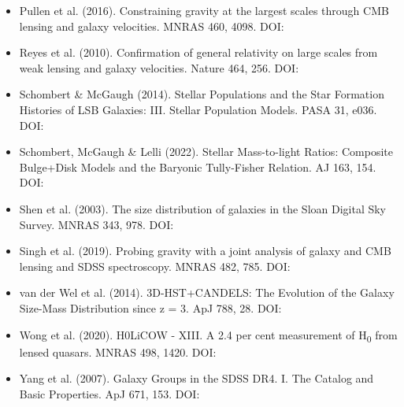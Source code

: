 \documentclass[11pt,a4paper]{article}
\begin{document}
\begin{itemize}
  \item Pullen et al. (2016). Constraining gravity at the largest scales through CMB lensing and galaxy velocities. MNRAS 460, 4098. DOI: \href{https://doi.org/10.1093/mnras/stw1249}{{\small\protect{}}}
  \item Reyes et al. (2010). Confirmation of general relativity on large scales from weak lensing and galaxy velocities. Nature 464, 256. DOI: \href{https://doi.org/10.1038/nature08857}{{\small\protect{}}}
  \item Schombert \& McGaugh (2014). Stellar Populations and the Star Formation Histories of LSB Galaxies: III. Stellar Population Models. PASA 31, e036. DOI: \href{https://doi.org/10.1017/pasa.2014.32}{{\small\protect{}}}
  \item Schombert, McGaugh \& Lelli (2022). Stellar Mass-to-light Ratios: Composite Bulge+Disk Models and the Baryonic Tully-Fisher Relation. AJ 163, 154. DOI: \href{https://doi.org/10.3847/1538-3881/ac5249}{{\small\protect{}}}
  \item Shen et al. (2003). The size distribution of galaxies in the Sloan Digital Sky Survey. MNRAS 343, 978. DOI: \href{https://doi.org/10.1046/j.1365-8711.2003.06740.x}{{\small\protect{}}}
  \item Singh et al. (2019). Probing gravity with a joint analysis of galaxy and CMB lensing and SDSS spectroscopy. MNRAS 482, 785. DOI: \href{https://doi.org/10.1093/mnras/sty2681}{{\small\protect{}}}
  \item van der Wel et al. (2014). 3D-HST+CANDELS: The Evolution of the Galaxy Size-Mass Distribution since z = 3. ApJ 788, 28. DOI: \href{https://doi.org/10.1088/0004-637X/788/1/28}{{\small\protect{}}}
  \item Wong et al. (2020). H0LiCOW  -  XIII. A 2.4 per cent measurement of H\textsubscript{0} from lensed quasars. MNRAS 498, 1420. DOI: \href{https://doi.org/10.1093/mnras/stz3094}{{\small\protect{}}}
  \item Yang et al. (2007). Galaxy Groups in the SDSS DR4. I. The Catalog and Basic Properties. ApJ 671, 153. DOI: \href{https://doi.org/10.1086/522027}{{\small\protect{}}}
\end{itemize}
\end{document}
